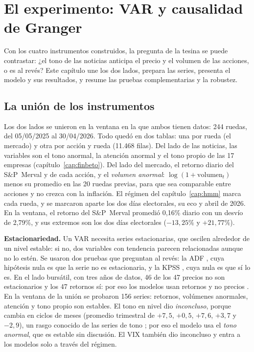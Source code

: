 \chapter{El experimento: VAR y causalidad de Granger}
\label{cap:var}

Con los cuatro instrumentos construidos, la pregunta de la tesina se puede contrastar: ¿el tono
de las noticias anticipa el precio y el volumen de las acciones, o es al revés? Este capítulo
une los dos lados, prepara las series, presenta el modelo y sus resultados, y resume las pruebas
complementarias y la robustez.

\section{La unión de los instrumentos}
\label{sec:union}

Los dos lados se unieron en la ventana en la que ambos tienen datos: 244 ruedas, del
05/05/2025 al 30/04/2026. Todo quedó en dos tablas: una por rueda (el mercado) y otra por acción
y rueda (11.468 filas). Del lado de las noticias, las variables son el tono anormal, la atención
anormal y el tono propio de las 17 empresas (capítulo~\ref{cap:finbeto}). Del lado del mercado,
el retorno diario del S\&P~Merval y de cada acción, y el \textit{volumen anormal}:
$\log(1+\text{volumen}_t)$ menos su promedio en las 20 ruedas previas, para que sea comparable
entre acciones y no crezca con la inflación. El régimen del capítulo~\ref{cap:hmm} marca cada
rueda, y se marcaron aparte los dos días electorales, su eco y abril de 2026. En la ventana, el
retorno del S\&P~Merval promedió 0,16\% diario con un desvío de 2,79\%, y sus extremos son los
dos días electorales ($-13{,}25\%$ y $+21{,}77\%$).

\textbf{Estacionariedad.} Un VAR necesita series estacionarias, que oscilen alrededor de un nivel
estable: si no, dos variables con tendencia parecen relacionadas aunque no lo estén. Se usaron dos
pruebas que preguntan al revés: la ADF \citep{dickey1979}, cuya hipótesis nula es que la serie no
es estacionaria, y la KPSS \citep{kpss1992}, cuya nula es que sí lo es. En el lado bursátil, con
tres años de datos, 46 de los 47 precios no son estacionarios y los 47 retornos sí: por eso los
modelos usan retornos y no precios \citep{zablotsky2002}. En la ventana de la unión se probaron
156 series: retornos, volúmenes anormales, atención y tono propio son estables. El tono en nivel
dio \textit{inconcluso}, porque cambia en ciclos de meses (promedio trimestral de $+7{,}5$, $+0{,}5$,
$+7{,}6$, $+3{,}7$ y $-2{,}9$), un rasgo conocido de las series de tono \citep{correarocha2026}; por
eso el modelo usa el \textit{tono anormal}, que es estable sin discusión. El VIX también dio
inconcluso y entra a los modelos solo a través del régimen.

